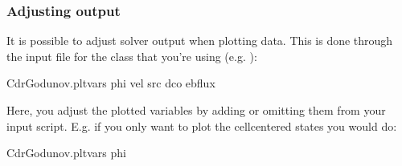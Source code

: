 \documentclass[letterpaper,10pt,english]{sphinxmanual}
\begin{document}
\begin{sphinxVerbatim}[commandchars=\\\{\},formatcom=\scriptsize]
 

    

   
   

  
\end{sphinxVerbatim}


\subsubsection{Adjusting output}
\label{\detokenize{Solvers/CDR:adjusting-output}}
It is possible to adjust solver output when plotting data.
This is done through the input file for the class that you’re using (e.g. ):

\begin{sphinxVerbatim}[commandchars=\\\{\},formatcom=\scriptsize]
CdrGodunov.plt\PYGZus{}vars  phi vel src dco ebflux  
\end{sphinxVerbatim}

Here, you adjust the plotted variables by adding or omitting them from your input script.
E.g. if you only want to plot the cell\sphinxhyphen{}centered states you would do:

\begin{sphinxVerbatim}[commandchars=\\\{\},formatcom=\scriptsize]
CdrGodunov.plt\PYGZus{}vars  phi  
\end{sphinxVerbatim}
\end{document}

